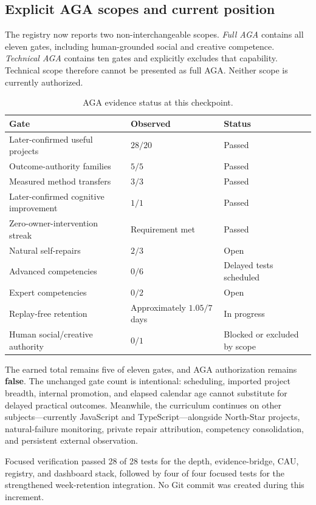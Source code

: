 \subsection{Explicit AGA scopes and current position}

The registry now reports two non-interchangeable scopes.  \emph{Full AGA}
contains all eleven gates, including human-grounded social and creative
competence.  \emph{Technical AGA} contains ten gates and explicitly excludes
that capability.  Technical scope therefore cannot be presented as full AGA.
Neither scope is currently authorized.

\begin{table}[htbp]
\centering
\caption{AGA evidence status at this checkpoint.}
\label{tab:aion-aga-status}
\begin{tabular}{lll}
\hline
\textbf{Gate} & \textbf{Observed} & \textbf{Status} \\
\hline
Later-confirmed useful projects & $28/20$ & Passed \\
Outcome-authority families & $5/5$ & Passed \\
Measured method transfers & $3/3$ & Passed \\
Later-confirmed cognitive improvement & $1/1$ & Passed \\
Zero-owner-intervention streak & Requirement met & Passed \\
Natural self-repairs & $2/3$ & Open \\
Advanced competencies & $0/6$ & Delayed tests scheduled \\
Expert competencies & $0/2$ & Open \\
Replay-free retention & Approximately $1.05/7$ days & In progress \\
Human social/creative authority & $0/1$ & Blocked or excluded by scope \\
\hline
\end{tabular}
\end{table}

The earned total remains five of eleven gates, and AGA authorization remains
\textbf{false}.  The unchanged gate count is intentional: scheduling, imported
project breadth, internal promotion, and elapsed calendar age cannot substitute
for delayed practical outcomes.  Meanwhile, the curriculum continues on other
subjects---currently JavaScript and TypeScript---alongside North-Star projects,
natural-failure monitoring, private repair attribution, competency
consolidation, and persistent external observation.

Focused verification passed 28 of 28 tests for the depth, evidence-bridge, CAU,
registry, and dashboard stack, followed by four of four focused tests for the
strengthened week-retention integration.  No Git commit was created during this
increment.

